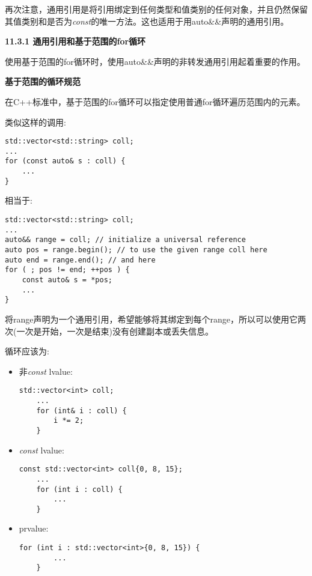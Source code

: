 再次注意，通用引用是将引用绑定到任何类型和值类别的任何对象，并且仍然保留其值类别和是否为\textit{const}的唯一方法。这也适用于用auto\&\&声明的通用引用。\par

\hspace*{\fill} \par %
\textbf{11.3.1 通用引用和基于范围的for循环}

使用基于范围的for循环时，使用auto\&\&声明的非转发通用引用起着重要的作用。\par

\hspace*{\fill} \par %
\textbf{基于范围的循环规范}

在C++标准中，基于范围的for循环可以指定使用普通for循环遍历范围内的元素。\par

类似这样的调用:\par

\begin{lstlisting}[caption={}]
std::vector<std::string> coll;
...
for (const auto& s : coll) {
	...
}
\end{lstlisting}

相当于:\par

\begin{lstlisting}[caption={}]
std::vector<std::string> coll;
...
auto&& range = coll; // initialize a universal reference
auto pos = range.begin(); // to use the given range coll here
auto end = range.end(); // and here
for ( ; pos != end; ++pos ) {
	const auto& s = *pos;
	...
}
\end{lstlisting}

将range声明为一个通用引用，希望能够将其绑定到每个range，所以可以使用它两次(一次是开始，一次是结束)没有创建副本或丢失信息。\par

循环应该为:\par

\begin{itemize}
	\item 非\textit{const} lvalue:
	\begin{lstlisting}[caption={}]
	std::vector<int> coll;
	...
	for (int& i : coll) {
		i *= 2;
	}
	\end{lstlisting}
	\item \textit{const} lvalue:
	\begin{lstlisting}[caption={}]
	const std::vector<int> coll{0, 8, 15};
	...
	for (int i : coll) {
		...
	}
	\end{lstlisting}
	\item prvalue:
	\begin{lstlisting}[caption={}]
	for (int i : std::vector<int>{0, 8, 15}) {
		...
	}
	\end{lstlisting}
\end{itemize}

